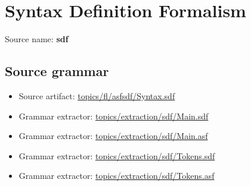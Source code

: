 \chapter{Syntax Definition Formalism}

 Source name: \textbf{sdf}

\section{Source grammar}

\begin{itemize}\item Source artifact: \href{http://github.com/grammarware/slps/blob/master/topics/fl/asfsdf/Syntax.sdf}{topics/fl/asfsdf/Syntax.sdf}\item Grammar extractor: \href{http://github.com/grammarware/slps/blob/master/topics/extraction/sdf/Main.sdf}{topics/extraction/sdf/Main.sdf}\item Grammar extractor: \href{http://github.com/grammarware/slps/blob/master/topics/extraction/sdf/Main.asf}{topics/extraction/sdf/Main.asf}\item Grammar extractor: \href{http://github.com/grammarware/slps/blob/master/topics/extraction/sdf/Tokens.sdf}{topics/extraction/sdf/Tokens.sdf}\item Grammar extractor: \href{http://github.com/grammarware/slps/blob/master/topics/extraction/sdf/Tokens.asf}{topics/extraction/sdf/Tokens.asf}\end{itemize}

